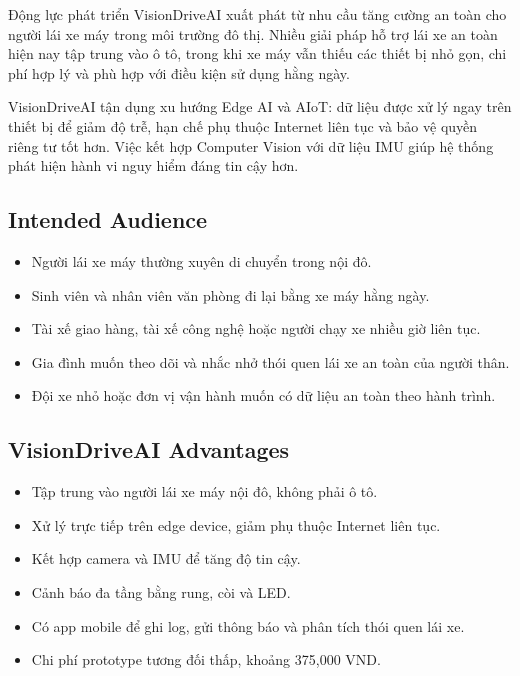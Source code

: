 \documentclass[12pt,a4paper]{article}
\begin{document}
Động lực phát triển VisionDriveAI xuất phát từ nhu cầu tăng cường an toàn cho người lái xe máy trong môi trường đô thị. Nhiều giải pháp hỗ trợ lái xe an toàn hiện nay tập trung vào ô tô, trong khi xe máy vẫn thiếu các thiết bị nhỏ gọn, chi phí hợp lý và phù hợp với điều kiện sử dụng hằng ngày.

VisionDriveAI tận dụng xu hướng Edge AI và AIoT: dữ liệu được xử lý ngay trên thiết bị để giảm độ trễ, hạn chế phụ thuộc Internet liên tục và bảo vệ quyền riêng tư tốt hơn. Việc kết hợp Computer Vision với dữ liệu IMU giúp hệ thống phát hiện hành vi nguy hiểm đáng tin cậy hơn.

\subsection{Intended Audience}

\begin{itemize}
    \item Người lái xe máy thường xuyên di chuyển trong nội đô.
    \item Sinh viên và nhân viên văn phòng đi lại bằng xe máy hằng ngày.
    \item Tài xế giao hàng, tài xế công nghệ hoặc người chạy xe nhiều giờ liên tục.
    \item Gia đình muốn theo dõi và nhắc nhở thói quen lái xe an toàn của người thân.
    \item Đội xe nhỏ hoặc đơn vị vận hành muốn có dữ liệu an toàn theo hành trình.
\end{itemize}

\subsection{VisionDriveAI Advantages}

\begin{itemize}
    \item Tập trung vào người lái xe máy nội đô, không phải ô tô.
    \item Xử lý trực tiếp trên edge device, giảm phụ thuộc Internet liên tục.
    \item Kết hợp camera và IMU để tăng độ tin cậy.
    \item Cảnh báo đa tầng bằng rung, còi và LED.
    \item Có app mobile để ghi log, gửi thông báo và phân tích thói quen lái xe.
    \item Chi phí prototype tương đối thấp, khoảng 375,000 VND.
\end{itemize}
\end{document}
